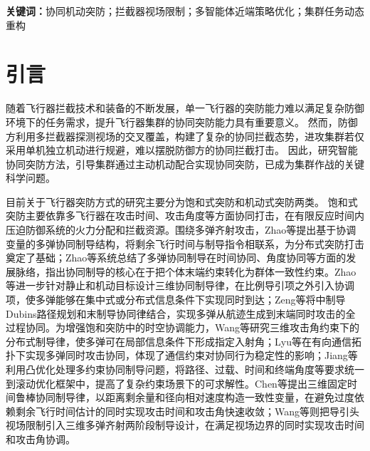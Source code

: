 \begin{abstract}


防空拦截能力不断提升使进攻飞行器面临更加严峻的生存威胁，集群协同突防对突破复杂防御系统具有重要价值。
针对协同拦截条件下进攻飞行器集群生存率低、突防难的问题，提出了一种考虑拦截器探测视场限制的集群任务动态重构智能协同机动突防方法。
首先，根据拦截器的探测范围与攻防相对运动关系，构建了多拦截器视场覆盖下的安全裕度评估模型，表征进攻飞行器的被捕获风险；
其次，基于熵正则势博弈理论开展集群突防任务动态重构机制设计，驱动集群自适应涌现出诱骗牵制与主攻突破的协同突防行为。
在此基础上，提出信任探索驱动的多智能体近端策略优化方法，通过信任反馈优化策略探索过程，抑制无效探索干扰，实现复杂拦截态势下突防策略的稳定寻优。
仿真结果表明，所提方法能够引导进攻集群根据拦截态势自适应快速调整协同策略，通过诱骗机动干扰拦截器的目标选择，形成多机配合突防态势，提升突防概率。


\end{abstract}

\noindent\textbf{关键词：}协同机动突防；拦截器视场限制；多智能体近端策略优化；集群任务动态重构

\section{引言}
\label{sec:introduction}

随着飞行器拦截技术和装备的不断发展，单一飞行器的突防能力难以满足复杂防御环境下的任务需求，提升飞行器集群的协同突防能力具有重要意义。
然而，防御方利用多拦截器探测视场的交叉覆盖，构建了复杂的协同拦截态势，进攻集群若仅采用单机独立机动进行规避，难以摆脱防御方的协同拦截打击。
因此，研究智能协同突防方法，引导集群通过主动机动配合实现协同突防，已成为集群作战的关键科学问题。


目前关于飞行器突防方式的研究主要分为饱和式突防和机动式突防两类。
饱和式突防主要依靠多飞行器在攻击时间、攻击角度等方面协同打击，在有限反应时间内压迫防御系统的火力分配和拦截资源。围绕多弹齐射攻击，Zhao等\cite{ZhaoZhou2008AAS}提出基于协调变量的多弹协同制导结构，将剩余飞行时间与制导指令相联系，为分布式突防打击奠定了基础；Zhao等\cite{ZhaoYang2017AAS}系统总结了多弹协同制导在时间协同、角度协同等方面的发展脉络，指出协同制导的核心在于把个体末端约束转化为群体一致性约束。Zhao等\cite{Zhao2015CJA}进一步针对静止和机动目标设计三维协同制导律，在比例导引项之外引入协调项，使多弹能够在集中式或分布式信息条件下实现同时到达；Zeng等\cite{Zeng2018CJA}将中制导Dubins路径规划和末制导协同律结合，实现多弹从航迹生成到末端同时攻击的全过程协同。为增强饱和突防中的时空协调能力，Wang等\cite{WangLu2018ISA}研究三维攻击角约束下的分布式制导律，使多弹可在局部信息条件下形成指定入射角；Lyu等\cite{Lyu2019AST}在有向通信拓扑下实现多弹同时攻击协同，体现了通信约束对协同行为稳定性的影响；Jiang等\cite{Jiang2018AST}利用凸优化处理多约束协同制导问题，将路径、过载、时间和终端角度等要求统一到滚动优化框架中，提高了复杂约束场景下的可求解性。Chen等\cite{Chen2021AST}提出三维固定时间鲁棒协同制导律，以距离剩余量和径向相对速度构造一致性变量，在避免过度依赖剩余飞行时间估计的同时实现攻击时间和攻击角快速收敛；Wang等\cite{Ai2019FOVSalvo}则把导引头视场限制引入三维多弹齐射两阶段制导设计，在满足视场边界的同时实现攻击时间和攻击角协调。

